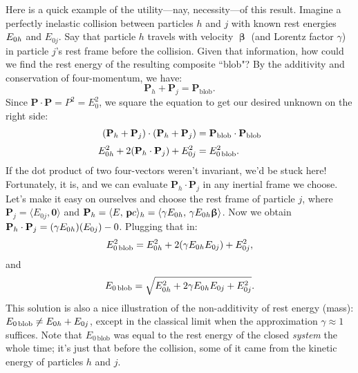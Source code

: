 \documentclass[12pt]{article}
\renewcommand{\vv}[1]{\mathbf{#1}}
\newcommand{\vvbeta}{\bm{\upbeta}}
\begin{document}
Here is a quick example of the utility---nay, necessity---of this result. Imagine a perfectly inelastic collision between particles $h$ and $j$ with known rest energies $E_{0 \mkern.5mu h}$ and $E_{0j}$. Say that particle $h$ travels with velocity $\vvbeta$ (and Lorentz factor $\gamma$) in particle $j$'s rest frame before the collision. Given that information, how could we find the rest energy of the resulting composite ``blob"? By the additivity and conservation of four-momentum, we have:
\begin{equation*}
\vv P_h + \vv P_j = \vv P_{\textrm{blob}}.
\end{equation*}
Since $\vv P \cdot \vv P = P^2 = E_0^2$, we square the equation to get our desired unknown on the right side:
\begin{equation*}
\begin{split}
(\vv P_h + \vv P_j) \cdot (\vv P_h + \vv P_j) &= \vv P_{\textrm{blob}} \cdot \vv P_{\textrm{blob}} \\[2pt]
E_{0 \mkern.5mu h}^2 + 2 (\vv P_h \cdot \vv P_j) + E_{0j}^2 &= E_{0 \, \textrm{blob}}^2.
\end{split}
\end{equation*}
If the dot product of two four-vectors weren't invariant, we'd be stuck here! Fortunately, it is, and we can evaluate $\vv P_h \cdot \vv P_j$ in any inertial frame we choose. Let's make it easy on ourselves and choose the rest frame of particle $j$, where $\vv P_j = \langle E_{0j}, \vv 0 \rangle$ and $\vv P_h = \langle E, \, \vv p c \rangle_h =  \langle \gamma E_{0 \mkern.5mu h}, \, \gamma E_{0 \mkern.5mu h} \vvbeta \rangle$. Now we obtain $\vv P_h \cdot \vv P_j = (\gamma E_{0 \mkern.5mu h})(E_{0j}) - 0$. Plugging that in:
\begin{equation*}
E_{0 \, \textrm{blob}}^2 = E_{0 \mkern.5mu h}^2 + 2 (\gamma E_{0 \mkern.5mu h} E_{0j}) + E_{0j}^2,
\end{equation*}
and
\begin{equation*}
E_{0 \, \textrm{blob}} = \sqrt{E_{0 \mkern.5mu h}^2 + 2 \gamma E_{0 \mkern.5mu h} E_{0j} + E_{0j}^2}.
\end{equation*}
This solution is also a nice illustration of the non-additivity of rest energy (mass): $E_{0 \, \textrm{blob}} \neq E_{0 \mkern.5mu h} + E_{0j}$, except in the classical limit when the approximation $\gamma \approx 1$ suffices. Note that $E_{0 \, \textrm{blob}}$ was equal to the rest energy of the closed \emph{system} the whole time; it's just that before the collision, some of it came from the kinetic energy of particles $h$ and $j$.
\end{document}
